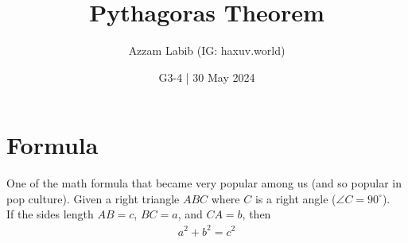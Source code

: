 \documentclass[11pt]{scrartcl}
\title{Pythagoras Theorem}
\author{Azzam Labib (IG: haxuv.world)}
\date{G3-4 | 30 May 2024}
\newcommand{\siku}[4][.21cm]
	{
	\coordinate (tempa) at ($(#3)!#1!(#2)$);
	\coordinate (tempb) at ($(#3)!#1!(#4)$);
	\coordinate (tempc) at ($(tempa)!0.5!(tempb)$);%
	\draw[black] (tempa) -- ($(#3)!2!(tempc)$) -- (tempb);
	}
\begin{document}
\maketitle
\section{Formula}
One of the math formula that became very popular among us (and so popular in pop culture). Given a right triangle $ABC$ where $C$ is a right angle ($\angle C = 90^\circ$).\\

If the sides length $AB=c$, $BC=a$, and $CA=b$, then
\begin{align*}
    a^2+b^2=c^2
\end{align*}
\begin{center}
\end{center}
\end{document}
